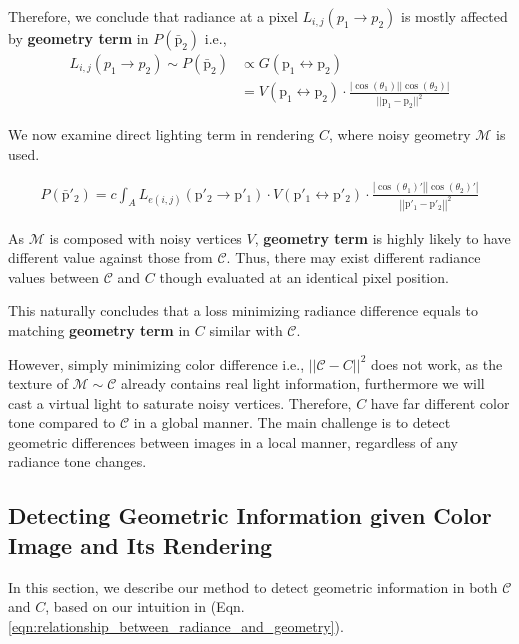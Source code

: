 Therefore, we conclude that radiance at a pixel $L_{i,j}(p_1 \rightarrow p_2)$ is mostly affected by \textbf{geometry term} in $\mathit{P}(\bar{\mathrm{p}}_2)$ i.e., 
\begin{align}
    L_{i,j}(p_1 \rightarrow p_2) \sim \mathit{P}(\bar{\mathrm{p}}_2) & \propto G(\mathrm{p}_1 \leftrightarrow \mathrm{p}_2) \nonumber \\
    & =V(\mathrm{p}_1 \leftrightarrow \mathrm{p}_2) \cdot \frac{|\cos(\theta_1)||\cos(\theta_2)|}{||\mathrm{p}_1-\mathrm{p}_2||^2}
    \label{eqn:relationship_between_radiance_and_geometry}
\end{align}

We now examine direct lighting term in rendering $C$, where noisy geometry $\mathcal{M}$ is used.

\begin{align}
    \mathit{P}\left(\bar{\mathrm{p}}'_2\right) = c\int_A L_{e(i,j)}(\mathrm{p}'_2\rightarrow \mathrm{p}'_1) \cdot V(\mathrm{p}'_1 \leftrightarrow \mathrm{p}'_2) \cdot \frac{\left|\cos(\theta_1)'\right|\left|\cos(\theta_2)'\right|}{\left|\left|\mathrm{p}'_1-\mathrm{p}'_2\right|\right|^2} \nonumber
    \label{LTE_path_integral_direct_lighting_SLAM}
\end{align}

As $\mathcal{M}$ is composed with noisy vertices $V$, \textbf{geometry term} is highly likely to have different value against those from $\mathcal{C}$. 
Thus, there may exist different radiance values between $\mathcal{C}$ and $C$ though evaluated at an identical pixel position.

This naturally concludes that a loss minimizing radiance difference equals to matching \textbf{geometry term} in $C$ similar with $\mathcal{C}$.

However, simply minimizing color difference i.e., $||\mathcal{C}-C||^2$ does not work, as the texture of $\mathcal{M} \sim \mathcal{C}$ already contains real light information, furthermore we will cast a virtual light to saturate noisy vertices. 
Therefore, $C$ have far different color tone compared to $\mathcal{C}$ in a global manner. 
The main challenge is to detect geometric differences between images in a local manner, regardless of any radiance tone changes.

\subsection{Detecting Geometric Information given Color Image and Its Rendering}
In this section, we describe our method to detect geometric information in both $\mathcal{C}$ and $C$, based on our intuition in (Eqn. \ref{eqn:relationship_between_radiance_and_geometry}).

